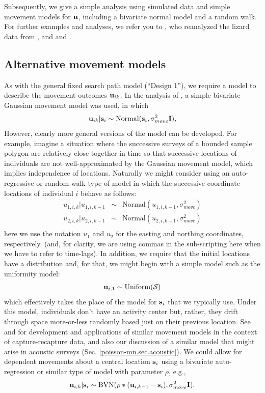 Subsequently, we give a simple analysis using simulated data and
simple movement models for ${\bf u}$, including a bivariate normal
model and a random walk.
For further examples and analyses, we refer you to
\citet{royle_dorazio:2008}, who reanalyzed the lizard data from
\citet{royle_young:2008}, and \citet{efford:2011ecol} and
\citet{marques_etal:2011}.



\subsection{Alternative movement models}
\label{searchencounter.sec.movement}

As with the general fixed search path model (``Design 1''), we require
a model to describe the movement outcomes ${\bf u}_{ik}$.
In the analysis of \citet{royle_young:2008}, a simple bivariate
Gaussian movement model was used, in which
\[
 {\bf u}_{ik} | {\bf s}_{i} \sim \mbox{Normal}({\bf s}_{i}, \sigma_{move}^{2}{\bf I}),
\]
However, clearly more general versions of the model can be developed.
For example, imagine a situation where the successive surveys of a
bounded sample polygon are relatively close together in time so that
successive locations of individuals are not well-approximated by the
Gaussian movement model, which implies independence of
locations. Naturally we might consider using an auto-regressive or
random-walk type of model in which the successive coordinate locations
of individual $i$ behave as follows:
\begin{eqnarray*}
 u_{1,i,k} | u_{1,i,k-1} &\sim &  \mbox{Normal}( u_{1,i,k-1},  \sigma_{move}^{2}) \\
 u_{2,i,k} | u_{2,i,k-1} &\sim &  \mbox{Normal}( u_{2,i,k-1},  \sigma_{move}^{2}) \\
\end{eqnarray*}
here we use the notation $u_{1}$ and $u_{2}$ for the easting and
northing coordinates, respectively. (and, for clarity, we are using
commas in the sub-scripting here when we have to refer to time-lags).
 In addition, we require that the initial locations have a
distribution and, for that, we might begin with a simple model such as
the uniformity model:
\[
 {\bf u}_{i,1} \sim \mbox{Uniform}({\cal S})
\]
which effectively takes the place of the model for ${\bf s}_{i}$ that
we typically use. Under this model, individuals don't have an activity
center but, rather, they drift through space more-or-less randomly
based just on their previous location. See \citet{ovaskainen:2004} and
\citet{ovaskainen_etal:2008} for development and applications of similar
movement models in the context of capture-recapture data,
and also our discussion of a similar model that might arise in
acoustic surveys (Sec. \ref{poisson-mn.sec.acoustic}).  We could allow
for dependent movements about a central location ${\bf s}_{i}$ using a
bivariate auto-regression or similar type of model with parameter
$\rho$, e.g.,
\[
 {\bf u}_{i,k} | {\bf s}_{i} \sim   \mbox{BVN}( \rho*( {\bf u}_{i,k-1} - {\bf s}_{i} ),  \sigma_{move}^{2} {\bf I}).
\]

